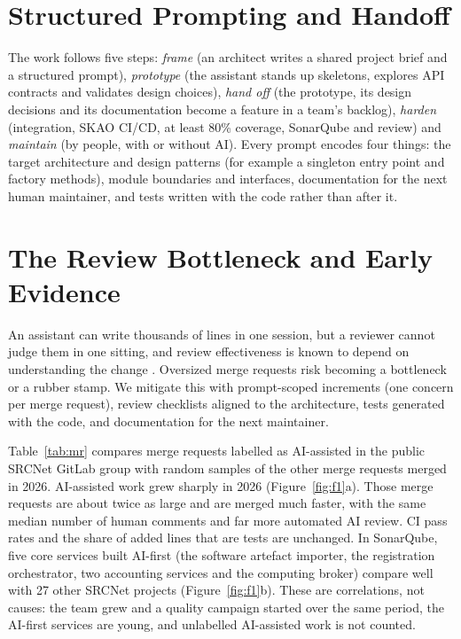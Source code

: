 \documentclass[11pt,twoside]{article}
\begin{document}
\section{Structured Prompting and Handoff}

The work follows five steps: \emph{frame} (an architect writes a shared
project brief and a structured prompt), \emph{prototype} (the assistant stands
up skeletons, explores API contracts and validates design choices),
\emph{hand off} (the prototype, its design decisions and its documentation
become a feature in a team's backlog), \emph{harden} (integration, SKAO CI/CD,
at least 80\% coverage, SonarQube and review) and \emph{maintain}
(by people, with or without AI). Every prompt encodes four
things: the target architecture and design patterns (for example a singleton
entry point and factory methods), module boundaries and interfaces,
documentation for the next human maintainer, and tests written with the code
rather than after it.

\section{The Review Bottleneck and Early Evidence}

An assistant can write thousands of lines in one session, but a reviewer cannot
judge them in one sitting, and review effectiveness is known to depend on
understanding the change \citep{Bacchelli2013}. Oversized merge requests risk
becoming a bottleneck or a rubber stamp. We mitigate this with prompt-scoped
increments (one concern per merge request), review checklists aligned to the
architecture, tests generated with the code, and documentation for the next
maintainer.

Table~\ref{tab:mr} compares merge requests labelled as AI-assisted in the
public SRCNet GitLab group with random samples of the other merge requests
merged in 2026.
AI-assisted work grew sharply in 2026 (Figure~\ref{fig:f1}a). Those merge
requests are about twice as large and are merged much faster, with the same
median number of human comments and far more automated AI review. CI pass
rates and the share of added lines that are tests are unchanged. In SonarQube,
five core services built AI-first (the software artefact importer, the
registration orchestrator, two accounting services and the computing broker)
compare well with 27 other SRCNet projects (Figure~\ref{fig:f1}b). These are
correlations, not causes: the team grew and a quality campaign started over the
same period, the AI-first services are young, and unlabelled AI-assisted work
is not counted.
\end{document}
